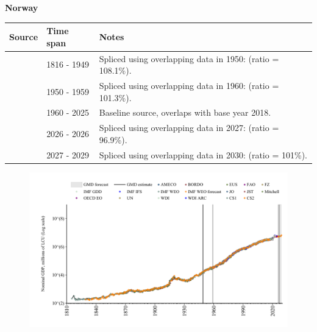 \documentclass[12pt,a4paper,landscape]{article}
\begin{document}
\begin{adjustbox}{max totalsize={\paperwidth}{\paperheight},center}
\begin{minipage}[t][\textheight][t]{\textwidth}
\vspace*{0.5cm}
{}
\begin{center}
{\Large\bfseries Norway}
\end{center}
\vspace{0.5cm}
\begin{table}[H]
\centering
\small
\begin{tabular}{|l|l|l|}
\hline
\textbf{Source} & \textbf{Time span} & \textbf{Notes} \\
\hline
\rowcolor{white}\cite{CS1_NOR}& 1816 - 1949 &Spliced using overlapping data in 1950: (ratio = 108.1\%).\\
\rowcolor{lightgray}\cite{IMF_GDD}& 1950 - 1959 &Spliced using overlapping data in 1960: (ratio = 101.3\%).\\
\rowcolor{white}\cite{OECD_EO}& 1960 - 2025 &Baseline source, overlaps with base year 2018.\\
\rowcolor{lightgray}\cite{AMECO}& 2026 - 2026 &Spliced using overlapping data in 2027: (ratio = 96.9\%).\\
\rowcolor{white}\cite{IMF_WEO_forecast}& 2027 - 2029 &Spliced using overlapping data in 2030: (ratio = 101\%).\\
\hline
\end{tabular}
\end{table}
\begin{figure}[H]
\centering
\includegraphics[width=\textwidth,height=0.6\textheight,keepaspectratio]{graphs/NOR_nGDP.pdf}
\end{figure}
\end{minipage}
\end{adjustbox}
\end{document}
